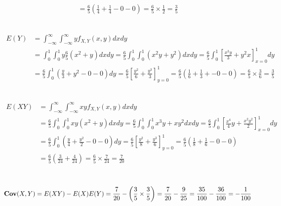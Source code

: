 \begin{ExerciseList}
\begin{align*}
= \frac{6}{5} \left(\frac{1}{4} + \frac{1}{4} - 0 - 0 \right) = \frac{6}{5}\times \frac{1}{2}=\frac{3}{5}
\end{align*}
\item~
\begin{align*}
E(Y) 
&= \int_{-\infty}^{\infty} \int_{-\infty}^{\infty} y f_{X,Y}(x,y) dx dy\\
&= \int_{0}^{1} \int_{0}^{1} y \frac{6}{5} \left( x^2 + y \right) dx dy
= \frac{6}{5} \int_{0}^{1} \int_{0}^{1}  \left( x^2y + y^2 \right) dx dy
= \frac{6}{5} \int_{0}^{1} \left[ \frac{x^3y}{3} + y^2x \right]_{x=0}^{1} dy\\
&= \frac{6}{5} \int_{0}^{1} \left( \frac{y}{3} + y^2 -0-0\right) dy
= \frac{6}{5} \left[ \frac{y^2}{6} + \frac{y^3}{3} \right]_{y=0}^{1} 
= \frac{6}{5} \left( \frac{1}{6} + \frac{1}{3} + - 0 -0 \right) = \frac{6}{5} \times \frac{3}{6}=\frac{3}{5}
\end{align*}
\item~
\begin{align*}
E(XY) 
&= \int_{-\infty}^{\infty} \int_{-\infty}^{\infty} xy f_{X,Y}(x,y) dx dy\\
&=\frac{6}{5} \int_{0}^{1} \int_{0}^{1}  xy \left( x^2 + y \right) dx dy
=\frac{6}{5} \int_{0}^{1} \int_{0}^{1} x^3y+xy^2 dx dy
=\frac{6}{5} \int_{0}^{1} \left[ \frac{x^4}{4}y+\frac{x^2 y^2}{2} \right]_{x=0}^1 dy\\
&=\frac{6}{5} \int_{0}^{1} \left( \frac{y}{4} + \frac{y^2}{2} -0-0\right)dy
=\frac{6}{5} \left[ \frac{y^2}{8} + \frac{y^3}{6}\right]_{y=0}^1 
=\frac{6}{5} \left(\frac{1}{8} + \frac{1}{6}-0-0\right)\\
&=\frac{6}{5} \left(\frac{3}{24}+\frac{4}{24}\right)=\frac{6}{5}\times\frac{7}{24}=\frac{7}{20}
\end{align*}
\item~
\[
\mathbf{Cov}(X,Y) = E(XY)-E(X)E(Y) = \frac{7}{20}-\left(\frac{3}{5} \times \frac{3}{5} \right) = \frac{7}{20}-\frac{9}{25} = \frac{35}{100}-\frac{36}{100} = -\frac{1}{100}
\]
\ee


\end{ExerciseList}
